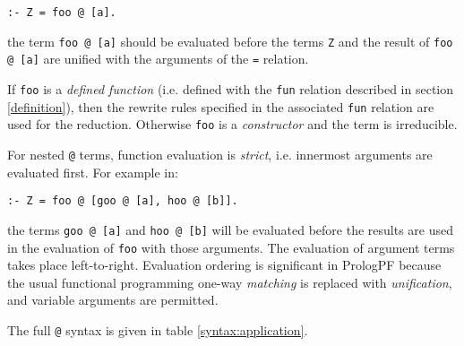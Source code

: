 \texttt{:- Z = foo @ [a].}

the term \texttt{foo @ [a]} should be evaluated
before the terms \texttt{Z} and the result of
\texttt{foo @ [a]} are unified with
the arguments of the \texttt{=} relation.

If \texttt{foo} is a \textit{defined function} 
(i.e. defined with the \texttt{fun} relation described in 
section \ref{definition}), then the rewrite rules specified
in the associated \texttt{fun} relation are used for the reduction.
Otherwise \texttt{foo} is a \textit{constructor} and the term is
irreducible.

For nested \texttt{@} terms, function evaluation is \textit{strict},
i.e. innermost arguments are evaluated first.
For example in:

\texttt{:- Z = foo @ [goo @ [a], hoo @ [b]].}

the terms \texttt{goo @ [a]} and \texttt{hoo @ [b]} will be evaluated
before the results are used in the evaluation of \texttt{foo} with
those arguments.  The evaluation of argument terms takes place
left-to-right.  Evaluation ordering is significant in PrologPF because
the usual functional programming one-way \textit{matching} is
replaced with \textit{unification}, and variable arguments are permitted.


The full \texttt{@} syntax is given in table \ref{syntax:application}.

